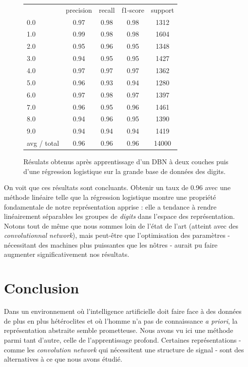\documentclass[10pt,a4paper]{article}
\begin{document}
\begin{figure}[ht!]\centering
	\begin{tabular}{l|c|c|c|c}
           &  precision&    recall&  f1-score&   support\\
        0.0&       0.97 &     0.98 &     0.98 &     1312\\
        1.0 &      0.99  &    0.98  &    0.98  &    1604\\
        2.0  &     0.95   &   0.96   &   0.95   &   1348\\
        3.0   &    0.94    &  0.95    &  0.95    &  1427\\
        4.0    &   0.97     & 0.97     & 0.97     & 1362\\
        5.0      & 0.96      &0.93      &0.94      &1280\\
        6.0     &  0.97&      0.98&      0.97&      1397\\
        7.0       &0.96 &     0.95 &     0.96 &     1461\\
        8.0&       0.94  &    0.96  &    0.95  &    1390\\
        9.0 &      0.94   &   0.94   &   0.94   &   1419\\
avg / total   &    0.96     & 0.96    &  0.96    & 14000
	\end{tabular}
	\label{DBNBigMnist}
	\caption{Résulats obtenus après apprentissage d'un DBN à deux couches puis d'une régression logistique sur la grande base de données des digits.}
\end{figure}

On voit que ces résultats sont concluants. Obtenir un taux de 0.96 avec une méthode linéaire telle que la régression logistique montre une propriété fondamentale de notre représentation apprise : elle a tendance à rendre linéairement séparables les groupes de \emph{digits} dans l'espace des représentation. Notons tout de même que nous sommes loin de l'état de l'art (atteint avec des \emph{convolutionnal network}), mais peut-être que l'optimisation des paramètres - nécessitant des machines plus puissantes que les nôtres - aurait pu faire augmenter significativement nos résultats. 






\section{Conclusion}

Dans un environnement où l'intelligence artificielle doit faire face à des données de plus en plus hétéroclites et où l'homme n'a pas de connaissance \emph{a priori}, la représentation abstraite semble prometteuse. Nous avons vu ici une méthode parmi tant d'autre, celle de l'apprentissage profond. Certaines représentations - comme les \emph{convolution network} qui nécessitent une structure de signal - sont des alternatives à ce que nous avons étudié. 
\end{document}
